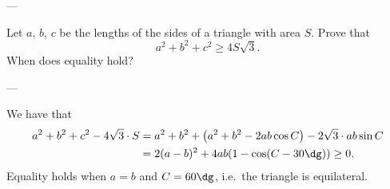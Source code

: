 
---

Let $a$, $b$, $c$ be the lengths of the sides of a triangle with area $S$. Prove that \[a^2+b^2+c^2\ge4S\sqrt3.\]
When does equality hold?

---

We have that
\begin{align*}
    a^2+b^2+c^2-4\sqrt3\cdot S&=a^2+b^2+\left(a^2+b^2-2ab\cos C\right)-2\sqrt3\cdot ab\sin C\\
    &=2(a-b)^2+4ab(1-\cos(C-30\dg))\ge0.
\end{align*}
Equality holds when $a=b$ and $C=60\dg$, i.e.\ the triangle is equilateral.

